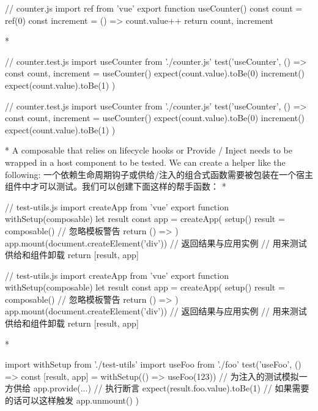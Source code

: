 \begin{paracol}{2}
\begin{codeJs}
// counter.js
import { ref } from 'vue'
export function useCounter() {
  const count = ref(0)
  const increment = () => count.value++
  return {
    count,
    increment
  }
}
\end{codeJs}
\switchcolumn[0]*%
\begin{codeJs}
// counter.test.js
import { useCounter } from './counter.js'
test('useCounter', () => {
  const { count, increment } = useCounter()
  expect(count.value).toBe(0)
  increment()
  expect(count.value).toBe(1)
})
\end{codeJs}
\switchcolumn
\begin{codeJs}
// counter.test.js
import { useCounter } from './counter.js'
test('useCounter', () => {
  const { count, increment } = useCounter()
  expect(count.value).toBe(0)
  increment()
  expect(count.value).toBe(1)
})
\end{codeJs}
\switchcolumn[0]*%
A composable that relies on lifecycle hooks or Provide / Inject needs to
be wrapped in a host component to be tested. We can create a helper like
the following:
\switchcolumn
一个依赖生命周期钩子或供给/注入的组合式函数需要被包装在一个宿主组件中才可以测试。我们可以创建下面这样的帮手函数：
\switchcolumn[0]*%
\begin{codeJs}
// test-utils.js
import { createApp } from 'vue'
export function withSetup(composable) {
  let result
  const app = createApp({
    setup() {
      result = composable()
      // 忽略模板警告
      return () => {}
    }
  })
  app.mount(document.createElement('div'))
  // 返回结果与应用实例
  // 用来测试供给和组件卸载
  return [result, app]
}
\end{codeJs}
\switchcolumn
\begin{codeJs}
// test-utils.js
import { createApp } from 'vue'
export function withSetup(composable) {
  let result
  const app = createApp({
    setup() {
      result = composable()
      // 忽略模板警告
      return () => {}
    }
  })
  app.mount(document.createElement('div'))
  // 返回结果与应用实例
  // 用来测试供给和组件卸载
  return [result, app]
}
\end{codeJs}
\switchcolumn[0]*%
\begin{codeJs}
import { withSetup } from './test-utils'
import { useFoo } from './foo'
test('useFoo', () => {
  const [result, app] = withSetup(() => useFoo(123))
  // 为注入的测试模拟一方供给
  app.provide(...)
  // 执行断言
  expect(result.foo.value).toBe(1)
  // 如果需要的话可以这样触发
  app.unmount()
})
\end{codeJs}
\switchcolumn

\end{paracol}
